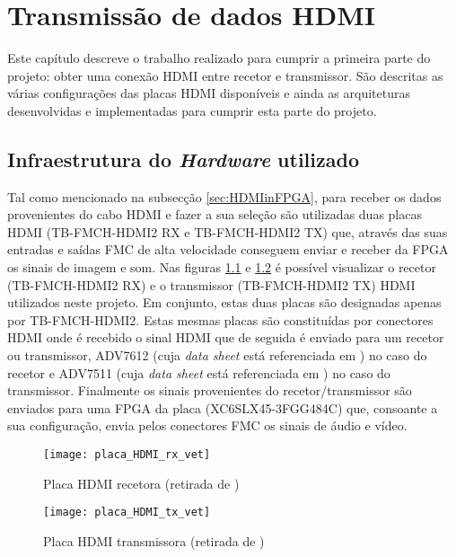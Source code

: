 \chapter{Transmissão de dados HDMI}\label{chap:chap3}

Este capítulo descreve o trabalho realizado para cumprir a primeira parte do projeto: obter uma conexão HDMI entre recetor e transmissor. São descritas as várias configurações das placas HDMI disponíveis e ainda as arquiteturas desenvolvidas e implementadas para cumprir esta parte do projeto. 

\section{Infraestrutura do \textit{Hardware} utilizado} \label{sec:hardware}

Tal como mencionado na subsecção \ref{sec:HDMIinFPGA}, para receber os dados provenientes do cabo HDMI e fazer a sua seleção são utilizadas duas placas HDMI (TB-FMCH-HDMI2 RX e TB-FMCH-HDMI2 TX) que, através das suas entradas e saídas FMC de alta velocidade conseguem enviar e receber da FPGA os sinais de imagem e som. Nas figuras \ref{fig:rx} e \ref{fig:tx} é possível visualizar o recetor (TB-FMCH-HDMI2 RX) e o transmissor (TB-FMCH-HDMI2 TX) HDMI utilizados neste projeto. Em conjunto, estas duas placas são designadas apenas por TB-FMCH-HDMI2. Estas mesmas placas são constituídas por conectores HDMI onde é recebido o sinal HDMI que de seguida é enviado para um recetor ou transmissor, ADV7612 (cuja \textit{data sheet} está referenciada em \cite{R038}) no caso do recetor e ADV7511 (cuja \textit{data sheet} está referenciada em \cite{R039}) no caso do transmissor. Finalmente os sinais provenientes do recetor/transmissor são enviados para uma FPGA da placa (XC6SLX45-3FGG484C) que, consoante a sua configuração, envia pelos conectores FMC os sinais de áudio e vídeo.

\begin{figure}[h!]
	\begin{center}
		\leavevmode
		\texttt{[image: placa\_HDMI\_rx\_vet]}
		\caption[Placa HDMI recetora]{Placa HDMI recetora (retirada de \cite{R009})}
		\label{fig:rx}
	\end{center}
\end{figure}

\begin{figure}[h!]
	\begin{center}
		\leavevmode
		\texttt{[image: placa\_HDMI\_tx\_vet]}
		\caption[Placa HDMI transmissora]{Placa HDMI transmissora (retirada de \cite{R009})}
		\label{fig:tx}
	\end{center}
\end{figure}


